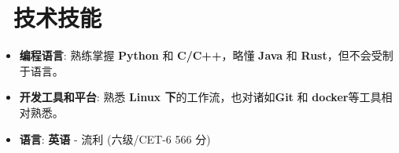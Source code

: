 \documentclass{resume}
\begin{document}


\section{\faCogs\ 技术技能}
\begin{itemize}[parsep=0.5ex]
  \item \textbf{编程语言}: 熟练掌握 \textbf{Python} 和 \textbf{C/C++}，略懂 \textbf{Java} 和 \textbf{Rust}，但不会受制于语言。
  \item \textbf{开发工具和平台}: 熟悉 \textbf{Linux 下}的工作流，也对诸如\textbf{Git} 和 \textbf{docker}等工具相对熟悉。
  \item \textbf{语言}: \textbf{英语} - 流利 (六级/CET-6 566 分)
\end{itemize}






%
%
\end{document}
